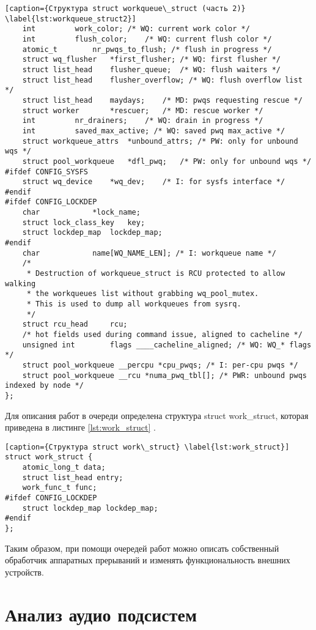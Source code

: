 \begin{lstlisting}[caption={Структура struct workqueue\_struct (часть 2)} \label{lst:workqueue_struct2}]
	int			work_color;	/* WQ: current work color */
	int			flush_color;	/* WQ: current flush color */
	atomic_t		nr_pwqs_to_flush; /* flush in progress */
	struct wq_flusher	*first_flusher;	/* WQ: first flusher */
	struct list_head	flusher_queue;	/* WQ: flush waiters */
	struct list_head	flusher_overflow; /* WQ: flush overflow list */
	struct list_head	maydays;	/* MD: pwqs requesting rescue */
	struct worker		*rescuer;	/* MD: rescue worker */
	int			nr_drainers;	/* WQ: drain in progress */
	int			saved_max_active; /* WQ: saved pwq max_active */
	struct workqueue_attrs	*unbound_attrs;	/* PW: only for unbound wqs */
	struct pool_workqueue	*dfl_pwq;	/* PW: only for unbound wqs */
#ifdef CONFIG_SYSFS
	struct wq_device	*wq_dev;	/* I: for sysfs interface */
#endif
#ifdef CONFIG_LOCKDEP
	char			*lock_name;
	struct lock_class_key	key;
	struct lockdep_map	lockdep_map;
#endif
	char			name[WQ_NAME_LEN]; /* I: workqueue name */
	/*
	 * Destruction of workqueue_struct is RCU protected to allow walking
	 * the workqueues list without grabbing wq_pool_mutex.
	 * This is used to dump all workqueues from sysrq.
	 */
	struct rcu_head		rcu;
	/* hot fields used during command issue, aligned to cacheline */
	unsigned int		flags ____cacheline_aligned; /* WQ: WQ_* flags */
	struct pool_workqueue __percpu *cpu_pwqs; /* I: per-cpu pwqs */
	struct pool_workqueue __rcu *numa_pwq_tbl[]; /* PWR: unbound pwqs indexed by node */
};
\end{lstlisting}

Для описания работ в очереди определена структура struct work\_struct, которая приведена в листинге \ref{lst:work_struct} \cite{workqueueh}.

\begin{lstlisting}[caption={Структура struct work\_struct} \label{lst:work_struct}]
struct work_struct {
	atomic_long_t data;
	struct list_head entry;
	work_func_t func;
#ifdef CONFIG_LOCKDEP
	struct lockdep_map lockdep_map;
#endif
};
\end{lstlisting}

Таким образом, при помощи очередей работ можно описать собственный обработчик аппаратных прерываний и изменять функциональность внешних устройств.

\section{Анализ аудио подсистем}

